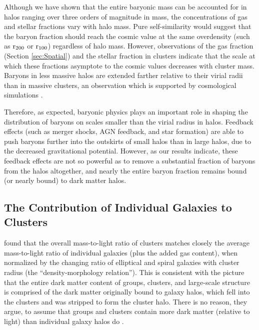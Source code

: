 Although we have shown that the entire baryonic mass can be accounted
for in halos ranging over three orders of magnitude in mass, the
concentrations of gas and stellar fractions vary with halo mass. Pure
self-similarity would suggest that the baryon fraction should reach
the cosmic value at the same overdensity (such as $\textrm{r\ensuremath{_{200}}}$ or
$\textrm{r}{}_{100}$) regardless of halo mass. However, observations of
the gas fraction (Section \ref{sec:Spatial}) and the stellar fraction
\citep{Bahcall2014} in clusters indicate that the scale at which these
fractions asymptote to the cosmic values decreases with cluster
mass. Baryons in less massive halos are extended farther relative to
their virial radii than in massive clusters, an observation which is
supported by cosmological simulations \citep{Battaglia2013}.

Therefore, as expected, baryonic physics plays an important role in shaping the
distribution of baryons on scales smaller than the virial radius in
halos. Feedback effects (such as merger shocks, AGN feedback, and star
formation) are able to push baryons further into the outskirts of
small halos than in large halos, due to the decreased gravitational
potential. However, as our results indicate, these feedback effects
are not so powerful as to remove a substantial fraction of baryons
from the halos altogether, and nearly the entire baryon fraction
remains bound (or nearly bound) to dark matter halos.

\subsection{The Contribution of Individual Galaxies to Clusters}
\label{sec:Implications.Individual}

\citet{Bahcall2014} found that the overall mass-to-light ratio of
clusters matches closely the average mass-to-light ratio of individual
galaxies (plus the added gas content), when normalized by the changing
ratio of elliptical and spiral galaxies with cluster radius (the
``density-morphology relation''). This is consistent with the picture
that the entire dark matter content of groups, clusters, and
large-scale structure is comprised of the dark matter originally bound
to galaxy halos, which fell into the clusters and was stripped to form
the cluster halo. There is no reason, they argue, to assume that
groups and clusters contain more dark matter (relative to light) than
individual galaxy halos do \cite[unlike as previously believed by
  e.g.,][]{Ostriker1974, Guo2010}.


